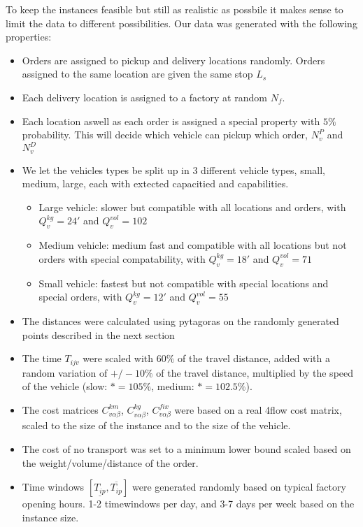 \documentclass[../main.tex]{subfiles}
\begin{document}
\par
To keep the instances feasible but still as realistic as possbile it makes sense to limit the data to different possibilities.
Our data was generated with the following properties:
\begin{itemize}
    \item Orders are assigned to pickup and delivery locations randomly. Orders assigned to the same location are given the same stop $L_s$
    \item Each delivery location is assigned to a factory at random $N_f$.
    \item Each location aswell as each order is assigned a special property with $5\%$ probability. This will decide which vehicle can pickup which order, $N^P_v$ and $N^D_v$
    \item We let the vehicles types be split up in 3 different vehicle types, small, medium, large, each with extected capacitied and capabilities.
        \begin{itemize}
            \item Large vehicle: slower but compatible with all locations and orders, with $Q^{kg}_v=24'$ and $Q^{vol}_v=102$
            \item Medium vehicle: medium fast and compatible with all locations but not orders with special compatability, with $Q^{kg}_v=18'$ and $Q^{vol}_v=71$ 
            \item Small vehicle: fastest but not compatible with special locations and special orders, with $Q^{kg}_v=12'$ and $Q^{vol}_v=55$ 
        \end{itemize}
    \item The distances were calculated using pytagoras on the randomly generated points described in the next section 
    \item The time $T_{ijv}$ were scaled with $60\%$ of the travel distance, added with a random variation of $+/- 10\%$ of the travel distance, multiplied by the speed of the vehicle (slow: $*=105\%$, medium: $*=102.5\%$).
    \item The cost matrices $C^{km}_{v\alpha\beta}$, $C^{kg}_{v\alpha\beta}$, $C^{fix}_{v\alpha\beta}$ were based on a real 4flow cost matrix, scaled to the size of the instance and to the size of the vehicle.  
    \item The cost of no transport was set to a minimum lower bound scaled based on the weight/volume/distance of the order.
    \item Time windows $[\underline{T_{ip}},\overline{T_{ip}}]$  were generated randomly based on typical factory opening hours. 1-2 timewindows per day, and 3-7 days per week based on the instance size. 
\end{itemize}
\end{document}
